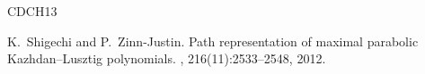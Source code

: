 \documentclass[oneside,english]{amsart}
\numberwithin{equation}{section}
\numberwithin{figure}{section}
\theoremstyle{plain}
\theoremstyle{plain}
\theoremstyle{plain}
\theoremstyle{remark}
\theoremstyle{plain}
\theoremstyle{plain}
\theoremstyle{plain}
\theoremstyle{plain}
\theoremstyle{plain}
\theoremstyle{plain}
\theoremstyle{plain}
\theoremstyle{plain}
\begin{document}
\begin{thebibliography}{CDCH{\etalchar{+}}13}



K.~Shigechi and P.~Zinn-Justin.
\newblock Path representation of maximal parabolic Kazhdan--Lusztig polynomials.
, 216(11):2533--2548, 2012.







\end{thebibliography}
\end{document}
